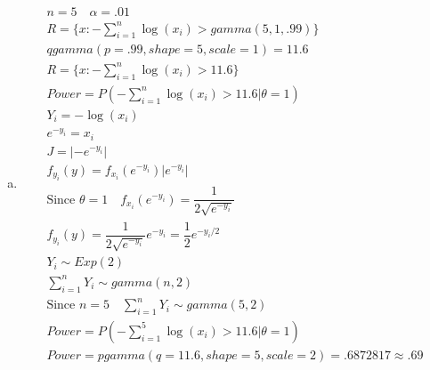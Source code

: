 \documentclass{article}
\newcommand{\sumn}{\sum_{i=1}^{n}}
\newcommand{\ta}{\theta}
\begin{document}
\begin{flushleft}
\begin{enumerate}[(a)]
	\item 
\begin{multline*}\\
n=5 \quad \alpha=.01\\
R=\{x:-\sumn \log(x_i)>gamma(5,1,.99) \}\\
qgamma(p=.99,shape = 5,scale = 1)=11.6\\
R=\{x:-\sumn \log(x_i)>11.6\}\\
Power=P(-\sumn \log(x_i)>11.6|\ta=1)\\
Y_i=-\log(x_i)\\
e^{-y_i}=x_i\\
J=|-e^{-y_i}|\\
f_{y_i}(y)=f_{x_i}(e^{-y_i})|e^{-y_i}|\\
\text{Since } \ta=1 \quad f_{x_i}(e^{-y_i})=\dfrac{1}{2\sqrt{e^{-y_i}}}\\
f_{y_i}(y)=\dfrac{1}{2\sqrt{e^{-y_i}}}e^{-y_i}=\dfrac{1}{2}e^{-y_i/2}\\
Y_i\sim Exp(2)\\
\sumn Y_i \sim gamma(n,2)\\
\text{Since } n=5 \quad\sumn Y_i \sim gamma(5,2)\\
Power=P(-\sum_{i=1}^{5} \log(x_i)>11.6|\ta=1)\\
Power=pgamma(q = 11.6,shape = 5,scale = 2)=.6872817\approx .69\\
\end{multline*}


\end{enumerate}
\end{flushleft}
\end{document}
